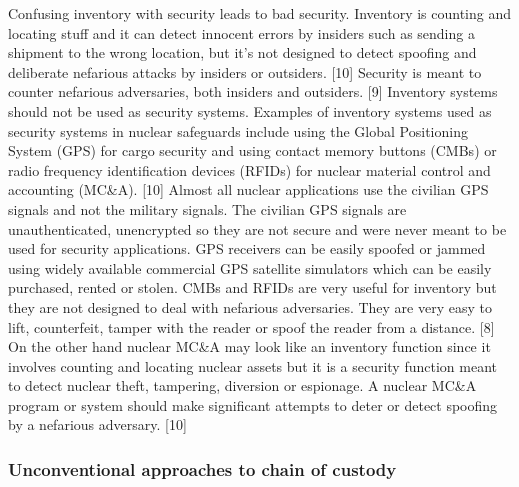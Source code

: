 \documentclass[twocolumn,a4paper]{article}
\begin{document}
Confusing inventory with security leads to bad security. Inventory is
counting and locating stuff and it can detect innocent errors by
insiders such as sending a shipment to the wrong location, but it’s
not designed to detect spoofing and deliberate nefarious attacks by
insiders or outsiders. [10] Security is meant to counter nefarious
adversaries, both insiders and outsiders. [9] Inventory systems should
not be used as security systems. Examples of inventory systems used as
security systems in nuclear safeguards include using the Global
Positioning System (GPS) for cargo security and using contact memory
buttons (CMBs) or radio frequency identification devices (RFIDs) for
nuclear material control and accounting (MC\&A). [10] Almost all
nuclear applications use the civilian GPS signals and not the military
signals.  The civilian GPS signals are unauthenticated, unencrypted so
they are not secure and were never meant to be used for security
applications. GPS receivers can be easily spoofed or jammed using
widely available commercial GPS satellite simulators which can be
easily purchased, rented or stolen. CMBs and RFIDs are very useful for
inventory but they are not designed to deal with nefarious
adversaries. They are very easy to lift, counterfeit, tamper with the
reader or spoof the reader from a distance. [8] On the other hand
nuclear MC\&A may look like an inventory function since it involves
counting and locating nuclear assets but it is a security function
meant to detect nuclear theft, tampering, diversion or espionage.  A
nuclear MC\&A program or system should make significant attempts to
deter or detect spoofing by a nefarious adversary. [10]

\subsubsection{Unconventional approaches to chain of custody}
\end{document}
